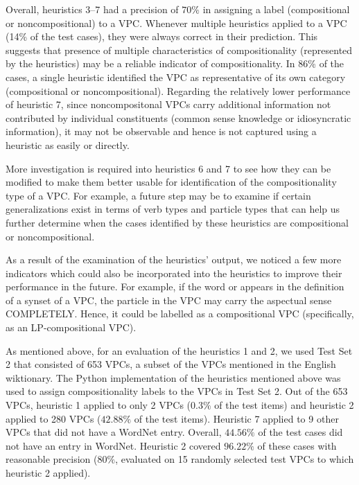 \documentclass[output=paper,modfonts,nonflat]{langsci/langscibook}
\begin{document}
Overall, heuristics 3--7 had a precision of $70\%$ in assigning a label (compositional or noncompositional) to a VPC. Whenever multiple heuristics applied to a VPC (14\% of the test cases), they were always correct in their prediction. This suggests that presence of multiple characteristics of compositionality (represented by the heuristics) may be a reliable indicator of compositionality. In 86\% of the cases, a single heuristic identified the VPC as representative of its own category (compositional or noncompositional). Regarding the relatively lower performance of heuristic 7, since noncompositonal VPCs carry additional information not contributed by individual constituents (common sense knowledge or idiosyncratic information), it may not be observable and hence is not captured using a heuristic as easily or directly.

More investigation is required into heuristics 6 and 7 to see how they can be modified to make them better usable for identification of the compositionality type of a VPC. For example, a future step may be to examine if certain generalizations exist in terms of verb types and particle types that can help us further determine when the cases identified by these heuristics are compositional or noncompositional.

As a result of the examination of the heuristics' output, we noticed a few more indicators which could also be incorporated into the heuristics to %
improve their performance in the future. For example, if the word  or  appears in the definition of a synset of a VPC, the particle in the VPC may carry the aspectual sense COMPLETELY. Hence, it could be labelled as a compositional VPC (specifically, as an LP-compositional VPC).

As mentioned above, for an evaluation of the heuristics 1 and 2, we used Test Set 2 that consisted of 653 VPCs, a subset of the VPCs mentioned in the English wiktionary. The Python implementation of the heuristics mentioned above was used to assign compositionality labels to the VPCs in Test Set 2. Out of the 653 VPCs, heuristic 1 applied to only 2 VPCs ($0.3\%$ of the test items) and heuristic 2 applied to 280 VPCs ($42.88\%$ of the test items). Heuristic 7 applied to 9 other VPCs that did not have a WordNet entry. Overall, $44.56\%$ of the test cases did not have an entry in WordNet.  Heuristic 2 covered $96.22\%$ of these cases with reasonable precision ($80\%$, evaluated on 15 randomly selected test VPCs to which heuristic 2 applied).
\end{document}
